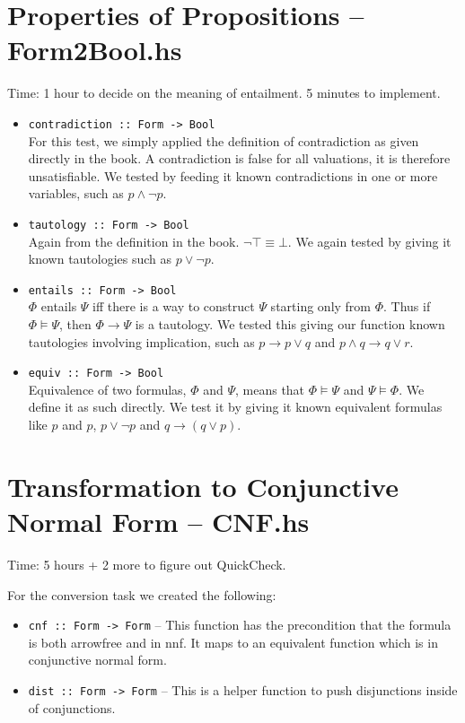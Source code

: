 \documentclass[11pt,a4paper]{article}
\numberwithin{equation}{section}%
\begin{document}
\section{Properties of Propositions \--- Form2Bool.hs}
Time: 1 hour to decide on the meaning of entailment. 5 minutes to implement.
\begin{itemize}
    \item \texttt{contradiction :: Form -> Bool} \\
        For this test, we simply applied the definition of contradiction as given directly in the book. A contradiction is false for all valuations, it is therefore unsatisfiable. We tested by feeding it known contradictions in one or more variables, such as $p \wedge \neg p$.
    \item \texttt{tautology :: Form -> Bool} \\
        Again from the definition in the book. $\neg \top \equiv \bot$. We again tested by giving it known tautologies such as $p \vee \neg p$.
    \item \texttt{entails :: Form -> Bool} \\
        $\Phi$ entails $\Psi$ iff there is a way to construct $\Psi$ starting only from $\Phi$. Thus if $\Phi \models \Psi$, then $\Phi \rightarrow \Psi$ is a tautology. We tested this giving our function known tautologies involving implication, such as $p \rightarrow p \vee q$ and $p \wedge q \rightarrow q \vee r$.
    \item \texttt{equiv :: Form -> Bool} \\ 
        Equivalence of two formulas, $\Phi$ and $\Psi$, means that $\Phi \models \Psi$ and $\Psi \models \Phi$. We define it as such directly. We test it by giving it known equivalent formulas like $p$ and $p$, $p \vee \neg p$ and $q \rightarrow (q \vee p)$.
\end{itemize}


\section{Transformation to Conjunctive Normal Form \--- CNF.hs}
Time: 5 hours + 2 more to figure out QuickCheck.

For the conversion task we created the following:
\begin{itemize}
    \item \texttt{cnf :: Form -> Form} \---
        This function has the precondition that the formula is both arrowfree and in nnf. It maps to an equivalent function which is in conjunctive normal form.
    \item \texttt{dist :: Form -> Form} \---
        This is a helper function to push disjunctions inside of conjunctions.
\end{itemize}
\end{document}
